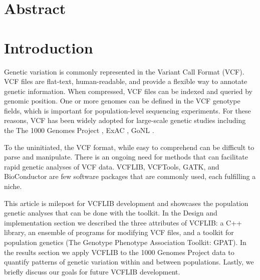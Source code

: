 \documentclass[10pt,letterpaper]{article}
\begin{document}
\section*{Abstract}




\linenumbers

\section*{Introduction}

Genetic variation is commonly represented in the Variant Call Format (VCF)\cite{vcftools}.  VCF files are flat-text, human-readable, and provide a flexible way to annotate genetic information.  When compressed, VCF files can be indexed and queried by genomic position. One or more genomes can be defined in the VCF genotype fields, which is important for population-level sequencing experiments. For these reasons, VCF has been widely adopted for large-scale genetic studies including the The 1000 Genomes Project \cite{1kg}, ExAC \cite{exac}, GoNL \cite{gonl}.

To the uninitiated, the VCF format, while easy to comprehend can be difficult to parse and manipulate. There is an ongoing need for methods that can facilitate rapid genetic analyses of VCF data.  VCFLIB, VCFTools\cite{vcftools}, GATK,  and BioConductor are few software packages that are commonly used, each fulfilling a niche. 

This article is milepost for VCFLIB development and showcases the population genetic analyses that can be done with the toolkit. In the Design and implementation section we described the three attributes of VCFLIB: a C++ library, an ensemble of programs for modifying VCF files, and a toolkit for population genetics (The Genotype Phenotype Association Toolkit: GPAT). In the results section we apply VCFLIB to the 1000 Genomes Project data to quantify patterns of genetic variation within and between populations.  Lastly, we briefly discuss our goals for future VCFLIB development.



\end{document}
